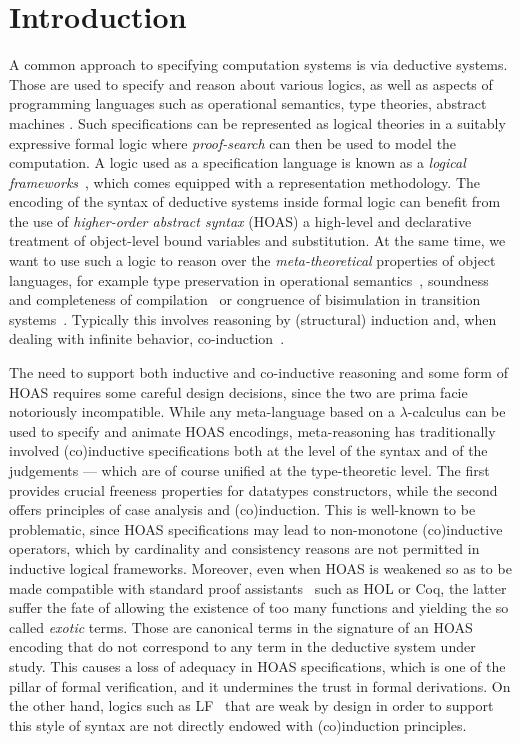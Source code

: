 \documentclass[preprint]{elsarticle}
\begin{document}
\section{Introduction}
\label{sec:intro}

A common approach to specifying computation systems is via deductive
systems. Those are used to specify and reason about various logics, as
well as aspects of programming languages such as operational
semantics, type theories, abstract machines \etc.  Such specifications
can be represented as logical theories in a suitably expressive formal
logic where \emph{proof-search} can then be used to model the
computation.  A logic used as a specification language is known as a
\emph{logical frameworks}~\cite{pfenning01handbook}, which comes
equipped with a representation methodology.  The encoding of the
syntax of deductive systems inside formal logic can benefit from the
use of \emph{higher-order abstract syntax} (HOAS) a high-level and declarative treatment of object-level bound variables
and substitution. At the same time, we want to use such a logic to
reason over the \emph{meta-theoretical} properties of object
languages, for example type preservation in operational
semantics~\cite{mcdowell02tocl}, soundness and completeness of
compilation~\cite{Momigliano03fos} or congruence of bisimulation in
transition systems~\cite{mcdowell03tcs}. Typically this involves
reasoning by (structural) induction and, when dealing with infinite
behavior, co-induction~\cite{Jacobs97}.

The need to support both inductive and co-inductive reasoning and some
form of HOAS requires some careful design decisions, since the two are
prima facie notoriously incompatible. While any meta-language based on
a $\lambda$-calculus can be used to specify and animate HOAS
encodings, meta-reasoning has traditionally involved (co)inductive
specifications both at the level of the syntax and of the judgements
--- which are of course unified at the type-theoretic level. The first
provides crucial freeness properties for datatypes constructors, while
the second offers principles of case analysis and (co)induction. This
is well-known to be problematic, since HOAS specifications may lead to
non-monotone (co)inductive operators, which by cardinality and
consistency reasons are not permitted in inductive logical
frameworks. Moreover, even when HOAS is weakened so as to be made
compatible with standard proof assistants~\cite{despeyroux94lpar} such
as HOL or Coq, the latter suffer the fate of allowing the existence of
too many functions and yielding the so called \emph{exotic}
terms. Those are canonical terms in the signature of an HOAS encoding
that do not correspond to any term in the deductive system under
study. This causes a loss of adequacy in HOAS specifications, which is
one of the pillar of formal verification, and it undermines the trust
in formal derivations. On the other hand, logics such as
LF~\cite{harper93jacm} that are weak by design in order to support this style of syntax are not directly endowed with
(co)induction principles.
\end{document}
